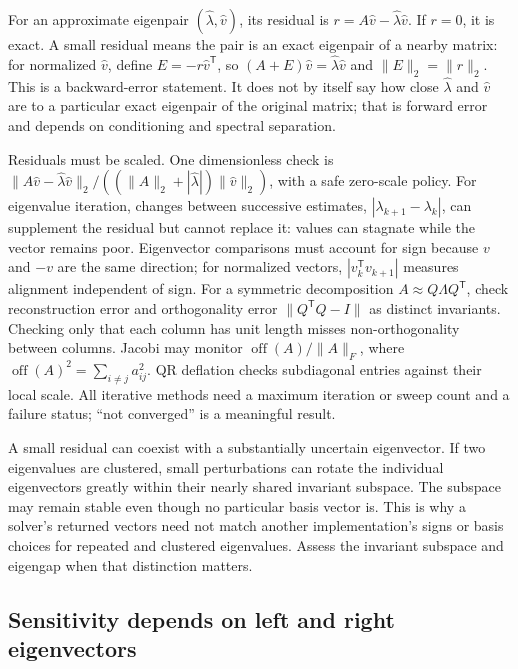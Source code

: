 For an approximate eigenpair \((\hat\lambda,\hat v)\), its residual is \(r=A\hat v-\hat\lambda\hat v\). If \(r=0\), it is exact. A small residual means the pair is an exact eigenpair of a nearby matrix: for normalized \(\hat v\), define \(E=-r\hat v^\mathsf T\), so \((A+E)\hat v=\hat\lambda\hat v\) and \(\|E\|_2=\|r\|_2\). This is a backward-error statement. It does not by itself say how close \(\hat\lambda\) and \(\hat v\) are to a particular exact eigenpair of the original matrix; that is forward error and depends on conditioning and spectral separation.

Residuals must be scaled. One dimensionless check is \(\|A\hat v-\hat\lambda\hat v\|_2/((\|A\|_2+|\hat\lambda|)\|\hat v\|_2)\), with a safe zero-scale policy. For eigenvalue iteration, changes between successive estimates, \(|\lambda_{k+1}-\lambda_k|\), can supplement the residual but cannot replace it: values can stagnate while the vector remains poor. Eigenvector comparisons must account for sign because \(v\) and \(-v\) are the same direction; for normalized vectors, \(|v_k^\mathsf Tv_{k+1}|\) measures alignment independent of sign. For a symmetric decomposition \(A\approx Q\Lambda Q^\mathsf T\), check reconstruction error and orthogonality error \(\|Q^\mathsf TQ-I\|\) as distinct invariants. Checking only that each column has unit length misses non-orthogonality between columns. Jacobi may monitor \(\operatorname{off}(A)/\|A\|_F\), where \(\operatorname{off}(A)^2=\sum_{i\ne j}a_{ij}^2\). QR deflation checks subdiagonal entries against their local scale. All iterative methods need a maximum iteration or sweep count and a failure status; ``not converged'' is a meaningful result.

A small residual can coexist with a substantially uncertain eigenvector. If two eigenvalues are clustered, small perturbations can rotate the individual eigenvectors greatly within their nearly shared invariant subspace. The subspace may remain stable even though no particular basis vector is. This is why a solver's returned vectors need not match another implementation's signs or basis choices for repeated and clustered eigenvalues. Assess the invariant subspace and eigengap when that distinction matters.

\subsection{Sensitivity depends on left and right eigenvectors}\label{01-foundations-i-ch020-sensitivity-depends-on-left-and-right-eigenvectors}

